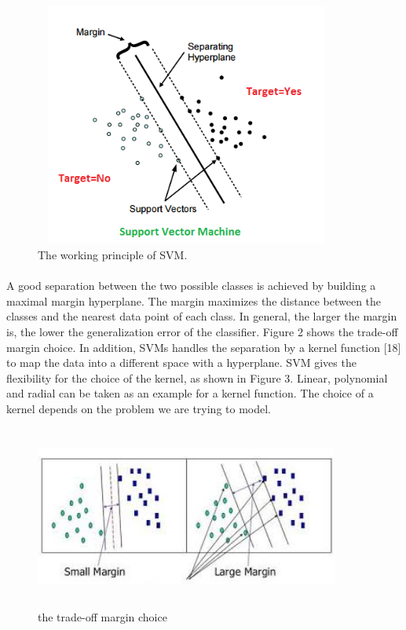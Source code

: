 \documentclass[a4paper,12pt,oneside]{article}
\begin{document}
\begin{figure}[H]
\centering
\includegraphics[height=8cm,width=10cm]{SVM-Planes.jpg}
\caption{The working principle of SVM.}
\end{figure}

\paragraph{}
A good separation between the two possible classes is
achieved by building a maximal margin hyperplane. The
margin maximizes the distance between the classes and
the nearest data point of each class. In general, the larger
the margin is, the lower the generalization error of the
classifier. Figure 2 shows the trade-off margin choice. In
addition, SVMs handles the separation by a kernel
function [18] to map the data into a different space with
a hyperplane. SVM gives the flexibility for the choice of
the kernel, as shown in Figure 3. Linear, polynomial and
radial can be taken as an example for a kernel function.
The choice of a kernel depends on the problem we are
trying to model.
\newpage
\hfill \break
\hfill \break
\hfill \break
\hfill \break
\begin{figure}[H]
\centering
\includegraphics[height=6cm,width=10cm]{image12.jpeg}
\caption{the trade-off  margin choice}
\end{figure}
\end{document}
